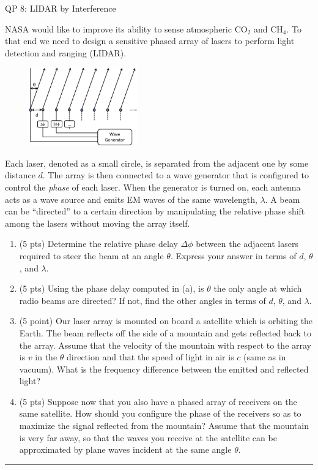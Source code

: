 \documentclass[12pt]{article}
\begin{document}
%
\begin{centering}
\LARGE{QP 8: LIDAR by Interference}
\end{centering}
\bigskip
\bigskip

NASA would like to improve its ability to sense atmospheric CO$_2$ and
CH$_4$. To
that end we need to design a sensitive phased array of lasers to
perform light detection and ranging (LIDAR).

\begin{figure}[!h]
  \centering
    \includegraphics[width=0.42\textwidth]{PhasedArray.pdf}
\end{figure}
Each laser, denoted as a small circle, is separated from the
adjacent one by some distance $d$. The array is then connected to a wave
generator that is configured to control the \emph{phase} of each
laser. When the generator is turned on, each antenna acts as a
wave source and emits EM waves of the same wavelength, $\lambda$. 
A beam can be ``directed'' to a certain direction by manipulating the
relative phase shift among the lasers without moving the array itself.

\begin{enumerate}[label=(\alph*)]
\item (5 pts)
Determine the relative phase delay $\Delta \phi$ between the adjacent
lasers required to steer the beam at an angle $\theta$. Express your
answer 
in terms of $d$, $\theta$, and $\lambda$.

\item (5 pts)
Using the phase delay computed in (a), is $\theta$ the only angle at which
radio beams are directed? If not, find the other angles 
in terms of $d$, $\theta$, and $\lambda$.

\item (5 point)
Our laser array is mounted on board a satellite which is orbiting the
Earth. The beam reflects off the side of a mountain and gets reflected
back to the array. Assume that the velocity of the mountain with
respect to the array is $v$ in the $\theta$ direction and that the
speed of light in air is $c$ (same as in vacuum). 
What is the frequency difference between the emitted and reflected light?

\item (5 pts)
Suppose now that you also have a phased array of receivers on the same
satellite. How should you configure the phase of the receivers so as
to maximize the signal reflected from the mountain?
Assume that the mountain is very far away, so that the waves you 
receive at the satellite
can be approximated by plane waves incident at the same angle $\theta$.

\end{enumerate}
\bigskip


{\color{Sepia} \hrule}
\end{document}

